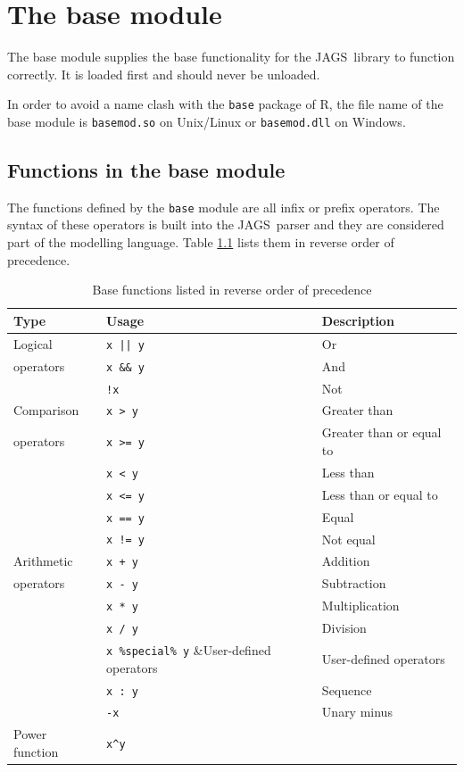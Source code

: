 \documentclass[11pt, a4paper, titlepage]{report}
\newcommand{\JAGS}{\textsf{JAGS}}
\newcommand{\R}{\textsf{R}}
\begin{document}
\chapter{The base module}

The base module supplies the base functionality for the \JAGS\ library
to function correctly. It is loaded first and should never be
unloaded.

In order to avoid a name clash with the \texttt{base} package of \R,
the file name of the base module is \texttt{basemod.so} on Unix/Linux
or \texttt{basemod.dll} on Windows.

\section{Functions in the base module}
\label{section:base:functions}

The functions defined by the \texttt{base} module are all infix or
prefix operators. The syntax of these operators is built into the
\JAGS\ parser and they are considered part of the modelling language.
Table \ref{table:base:functions} lists them in reverse order of
precedence.

\begin{table}[h]
\begin{center}
\begin{tabular}{lll}
\hline
Type & Usage & Description\\ 
\hline
Logical           & \verb+x || y+ & Or \\
operators         & \verb+x && y+ & And \\
                  & \verb+!x+     & Not \\
\hline
Comparison  & \verb+x > y+ & Greater than\\
operators   & \verb+x >= y+ & Greater than or equal to  \\
            & \verb+x < y+ & Less than \\
            & \verb+x <= y+ & Less than or equal to \\
            & \verb+x == y+ & Equal \\
            & \verb+x != y+ & Not equal \\
\hline
Arithmetic  & \verb-x + y- & Addition \\
operators   & \verb+x - y+ & Subtraction\\
            & \verb+x * y+ & Multiplication \\
            & \verb+x / y+ & Division \\
            & \verb+x %special% y+ &User-defined operators\\
            & \verb+x : y+ & Sequence \\
            & \verb+-x+ & Unary minus\\
\hline
Power function & \verb+x^y+ & \\
\hline
\end{tabular}
\caption{Base functions listed in reverse order of precedence 
  \label{table:base:functions}}
\end{center}
\end{table}
\end{document}
